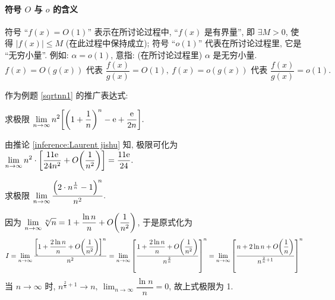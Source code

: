 \paragraph{符号 $O$ 与 $o$ 的含义}
符号 “$f(x)=O(1)$” 表示在所讨论过程中, “$f(x) $ 是有界量”, 即 $ \exists M>0$, 使得 $ |f(x)| \leqslant M $ (在此过程中保持成立);
符号 “$o(1)$” 代表在所讨论过程里, 它是 “无穷小量”. 例如: $ \alpha=o(1) $, 意指: (在所讨论过程里) $\alpha $ 是无穷小量.
$$f(x)=O(g(x)) \text{ 代表 } \dfrac{f(x)}{g(x)}=O(1),~f(x)=o(g(x))\text{ 代表 }\dfrac{f(x)}{g(x)}=o(1).$$

\begin{inference}[Laurent  级数]\label{inference:Laurent jishu}
    作为例题 \ref{sqrtnn1} 的推广表达式:
\end{inference}

\begin{example}
    求极限 $\displaystyle\lim_{n\to\infty}n^2\qty[\qty(1+\dfrac{1}{n})^n-\mathrm{e}+\dfrac{\mathrm{e}}{2n}].$
\end{example}
\begin{solution}
    由推论 \ref{inference:Laurent jishu} 知, 极限可化为 $\displaystyle\lim_{n\to\infty}n^2\cdot\qty[\dfrac{11\mathrm{e}}{24n^2}+O\qty(\dfrac{1}{n^2})]=\dfrac{11\mathrm{e}}{24}.$
\end{solution}

\begin{example}
    求极限 $\displaystyle\lim_{n\to\infty}\dfrac{\qty(2\cdot n^{\frac{1}{n}}-1)^n}{n^2}.$
\end{example}
\begin{solution}
    因为 $\displaystyle \lim_{n\to\infty}\sqrt[n]{n}=1+\dfrac{\ln n}{n}+O\qty(\dfrac{1}{n^2})$, 于是原式化为
    $$I=\lim_{n\to\infty}\dfrac{\qty[1+\dfrac{2\ln n}{n}+O\qty(\dfrac{1}{n^2})]^n}{n^2}=\lim_{n\to\infty}\qty[\dfrac{1+\dfrac{2\ln n}{n}+O\qty(\dfrac{1}{n^2})}{n^{\frac{2}{n}}}]^n=\lim_{n\to\infty}\qty[\dfrac{n+2\ln n+O\qty(\dfrac{1}{n})}{n^{\frac{2}{n}+1}}]^n$$
    当 $n\to\infty$ 时, $n^{\frac{2}{n}+1}\to n,~\displaystyle\lim_{n\to\infty}\dfrac{\ln n}{n}=0$, 故上式极限为 1.
\end{solution}

